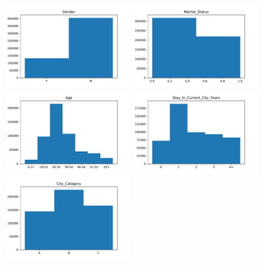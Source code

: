 \documentclass{article}
\begin{document}
\begin{figure}[h]
  \begin{center}
    \includegraphics[width=0.49\textwidth]{plots/explore_Gender.pdf}
    \includegraphics[width=0.49\textwidth]{plots/explore_Marital_Status.pdf}
    \includegraphics[width=0.49\textwidth]{plots/explore_Age.pdf}
    \includegraphics[width=0.49\textwidth]{plots/explore_Stay_In_Current_City_Years.pdf}
    \includegraphics[width=0.49\textwidth]{plots/explore_City_Category.pdf}

\end{center}
\end{figure}
\end{document}
